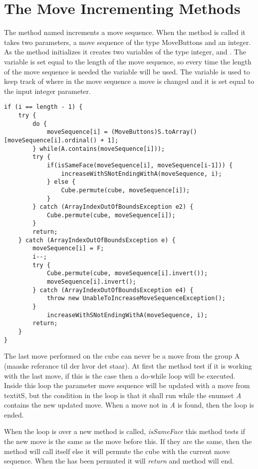 \section{The Move Incrementing Methods}
\label{sec:increaseWithSNotEndingWithA}
The method named  increments a move sequence.
When the method is called it takes two parameters, a move sequence of the type MoveButtons and an integer.
As the method initializes it creates two variables of the type integer,  and .
The variable  is set equal to the length of the move sequence, so every time the length of the move sequence is needed the variable  will be used.
The variable  is used to keep track of where in the move sequence a move is changed and it is set equal to the input integer parameter. 

\begin{lstlisting}[style=sourceCode, caption=\myCaption{Key point in the incrementing method of kociemba's optimal solver}, label=src:kociemba2]
if (i == length - 1) {
	try {
		do {
			moveSequence[i] = (MoveButtons)S.toArray()[moveSequence[i].ordinal() + 1];
		} while(A.contains(moveSequence[i]));
		try {
			if(isSameFace(moveSequence[i], moveSequence[i-1])) {
				increaseWithSNotEndingWithA(moveSequence, i);
			} else {
				Cube.permute(cube, moveSequence[i]);
			}
		} catch (ArrayIndexOutOfBoundsException e2) {
			Cube.permute(cube, moveSequence[i]);
		}
		return;
	} catch (ArrayIndexOutOfBoundsException e) {
		moveSequence[i] = F;
		i--;
		try {
			Cube.permute(cube, moveSequence[i].invert());
			moveSequence[i].invert();
		} catch (ArrayIndexOutOfBoundsException e4) {
			throw new UnableToIncreaseMoveSequenceException();
		}
			increaseWithSNotEndingWithA(moveSequence, i);
		return;
	}
}
\end{lstlisting}

The last move performed on the cube can never be a move from the group A (maaske referance til der hvor det staar).
At first the method test if it is working with the last move, if this is the case then a do-while loop will be executed.
Inside this loop the parameter move sequence will be updated with a move from textit{S}, but the condition in the loop is that it shall run while the enumset \textit{A} contains the new updated move.
When a move not in \textit{A} is found, then the loop is ended.

When the loop is over a new method is called, \textit{isSameFace} this method tests if the new move is the same as the move before this.
If they are the same, then the method will call itself else it will permute the cube with the current move sequence.
When the \rubik{} has been permuted it will \textit{return} and method will end.

